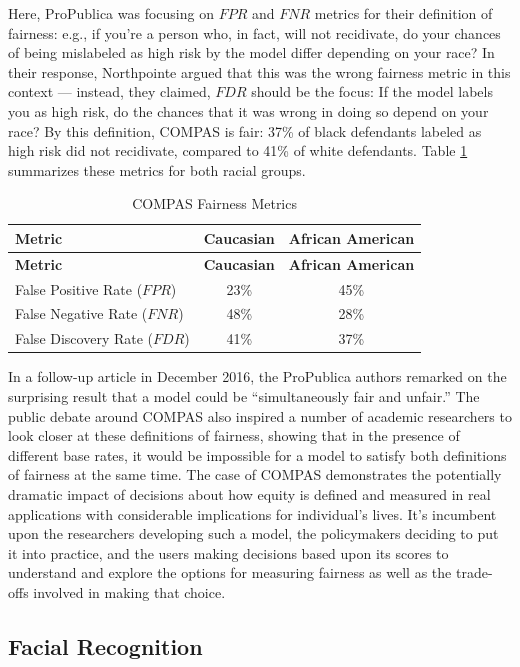 \documentclass[]{krantz}
\begin{document}
Here, ProPublica was focusing on \(FPR\) and \(FNR\) metrics for their
definition of fairness: e.g., if you're a person who, in fact, will not
recidivate, do your chances of being mislabeled as high risk by the
model differ depending on your race? In their response, Northpointe
argued that this was the wrong fairness metric in this context ---
instead, they claimed, \(FDR\) should be the focus: If the model labels
you as high risk, do the chances that it was wrong in doing so depend on
your race? By this definition, COMPAS is fair: 37\% of black defendants
labeled as high risk did not recidivate, compared to 41\% of white
defendants. Table \ref{tab:compastable} summarizes these metrics for
both racial groups.

\begin{longtable}[]{@{}lcc@{}}
\caption{\label{tab:compastable} COMPAS Fairness Metrics}\tabularnewline
\toprule
\textbf{Metric} & \textbf{Caucasian} & \textbf{African
American}\tabularnewline
\midrule
\endfirsthead
\toprule
\textbf{Metric} & \textbf{Caucasian} & \textbf{African
American}\tabularnewline
\midrule
\endhead
False Positive Rate (\(FPR\)) & 23\% & 45\%\tabularnewline
False Negative Rate (\(FNR\)) & 48\% & 28\%\tabularnewline
False Discovery Rate (\(FDR\)) & 41\% & 37\%\tabularnewline
\bottomrule
\end{longtable}

In a follow-up article in December 2016, the ProPublica authors remarked
on the surprising result that a model could be ``simultaneously fair and
unfair.'' The public debate around COMPAS also inspired a number of
academic researchers to look closer at these definitions of fairness,
showing that in the presence of different base rates, it would be
impossible for a model to satisfy both definitions of fairness at the
same time. The case of COMPAS demonstrates the potentially dramatic
impact of decisions about how equity is defined and measured in real
applications with considerable implications for individual's lives. It's
incumbent upon the researchers developing such a model, the policymakers
deciding to put it into practice, and the users making decisions based
upon its scores to understand and explore the options for measuring
fairness as well as the trade-offs involved in making that choice.

\subsection{Facial Recognition}\label{facial-recognition}
\end{document}
